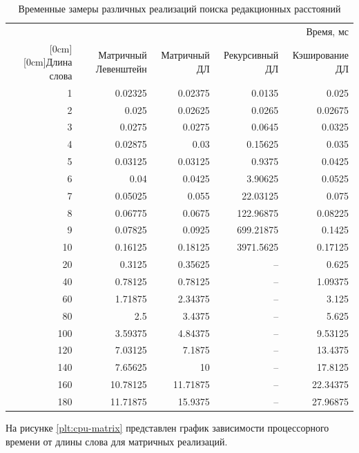 \begin{table}[H]
	\centering
	\footnotesize
	\caption{\label{table:time} Временные замеры различных реализаций поиска редакционных расстояний}
	\begin{center}
		\begin{tabular}{|r|r|r|r|r|}
			\hline
			& \multicolumn{4}{r|}{Время, мс} \\
			\cline{2-5}
			\raisebox{1.5ex}[0cm][0cm]{Длина слова}
			& Матричный Левенштейн & Матричный ДЛ & Рекурсивный ДЛ & Кэширование ДЛ \\
			\hline
			1 & 0.02325 & 0.02375 & 0.0135 & 0.025 \\ \hline
			2 & 0.025 & 0.02625 & 0.0265 & 0.02675 \\ \hline
			3 & 0.0275 & 0.0275 & 0.0645 & 0.0325 \\ \hline
			4 & 0.02875 & 0.03 & 0.15625 & 0.035 \\ \hline
			5 & 0.03125 & 0.03125 & 0.9375 & 0.0425 \\ \hline
			6 & 0.04 & 0.0425 & 3.90625 & 0.0525 \\ \hline
			7 & 0.05025 & 0.055 & 22.03125 & 0.075 \\ \hline
			8 & 0.06775 & 0.0675 & 122.96875 & 0.08225 \\ \hline
			9 & 0.07825 & 0.0925 & 699.21875 & 0.1425 \\ \hline
			10 & 0.16125 & 0.18125 & 3971.5625 & 0.17125 \\ \hline
			20 & 0.3125 & 0.35625 & -- & 0.625 \\ \hline
			40 & 0.78125 & 0.78125 & -- & 1.09375 \\ \hline
			60 & 1.71875 & 2.34375 & -- & 3.125 \\ \hline
			80 & 2.5 & 3.4375 & -- & 5.625 \\ \hline
			100 & 3.59375 & 4.84375 & -- & 9.53125 \\ \hline
			120 & 7.03125 & 7.1875 & -- & 13.4375 \\ \hline
			140 & 7.65625 & 10 & -- & 17.8125 \\ \hline
			160 & 10.78125 & 11.71875 & -- & 22.34375 \\ \hline
			180 & 11.71875 & 15.9375 & -- & 27.96875 \\ \hline
		\end{tabular}
	\end{center}
\end{table}

На рисунке \ref{plt:cpu-matrix} представлен график зависимости процессорного времени от длины слова для матричных реализаций.


